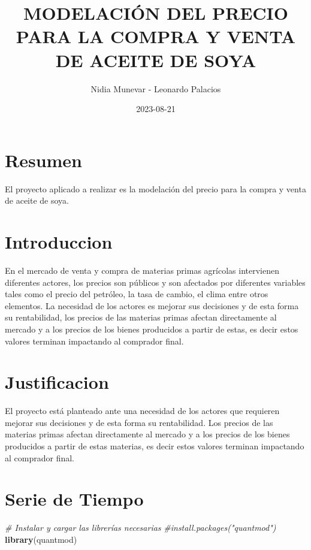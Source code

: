 \documentclass[
]{book}
\title{MODELACIÓN DEL PRECIO PARA LA COMPRA Y VENTA DE ACEITE DE SOYA}
\author{Nidia Munevar - Leonardo Palacios}
\date{2023-08-21}
\newenvironment{Shaded}{\begin{snugshade}}{\end{snugshade}}
\newcommand{\CommentTok}[1]{\textcolor[rgb]{0.56,0.35,0.01}{\textit{#1}}}
\newcommand{\FunctionTok}[1]{\textcolor[rgb]{0.13,0.29,0.53}{\textbf{#1}}}
\newcommand{\NormalTok}[1]{#1}
\begin{document}
\maketitle

{
\setcounter{tocdepth}{1}
\tableofcontents
}
\hypertarget{resumen}{%
\chapter{Resumen}\label{resumen}}

El proyecto aplicado a realizar es la modelación del precio para la compra y venta de aceite de soya.

\hypertarget{introduccion}{%
\chapter{Introduccion}\label{introduccion}}

En el mercado de venta y compra de materias primas agrícolas intervienen diferentes actores, los precios son públicos y son afectados por diferentes variables tales como el precio del petróleo, la tasa de cambio, el clima entre otros elementos. La necesidad de los actores es mejorar sus decisiones y de esta forma su rentabilidad, los precios de las materias primas afectan directamente al mercado y a los precios de los bienes producidos a partir de estas, es decir estos valores terminan impactando al comprador final.

\hypertarget{justificacion}{%
\chapter{Justificacion}\label{justificacion}}

El proyecto está planteado ante una necesidad de los actores que requieren mejorar sus decisiones y de esta forma su rentabilidad. Los precios de las materias primas afectan directamente al mercado y a los precios de los bienes producidos a partir de estas materias, es decir estos valores terminan impactando al comprador final.

\hypertarget{serie-de-tiempo}{%
\chapter{Serie de Tiempo}\label{serie-de-tiempo}}

\begin{Shaded}
\begin{Highlighting}[]
\CommentTok{\# Instalar y cargar las librerías necesarias}
\CommentTok{\#install.packages("quantmod")}
\FunctionTok{library}\NormalTok{(quantmod)}
\end{Highlighting}
\end{Shaded}
\end{document}
